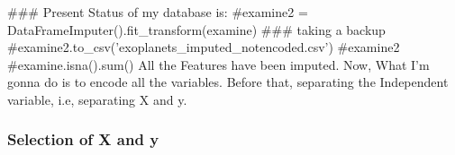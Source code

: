 \documentclass[11pt]{article}
\begin{document}
    \begin{center}
    \end{center}
    { \hspace*{\fill} \\}
    
    \begin{center}
    \end{center}
    { \hspace*{\fill} \\}
    
    \begin{center}
    \end{center}
    { \hspace*{\fill} \\}
    
    \begin{center}
    \end{center}
    { \hspace*{\fill} \\}
    
    \begin{center}
    \end{center}
    { \hspace*{\fill} \\}
    ### Present Status of my database is:
#examine2 = DataFrameImputer().fit_transform(examine)
### taking a backup
#examine2.to_csv('exoplanets_imputed_notencoded.csv')
#examine2
#examine.isna().sum()
    All the Features have been imputed. Now, What I'm gonna do is to encode
all the variables. Before that, separating the Independent variable,
i.e, separating X and y.

    \subsubsection{Selection of X and y}\label{selection-of-x-and-y}
\end{document}
